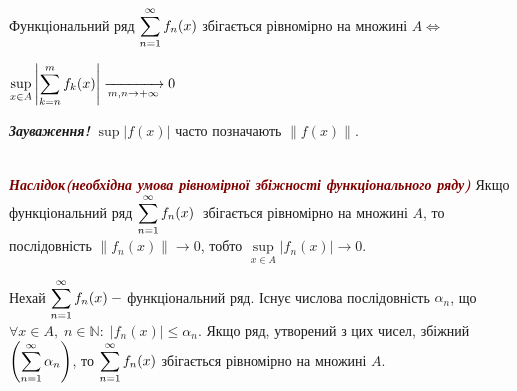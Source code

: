\begin{theorem} 
Функціональний ряд $\displaystyle\sum\limits_{n=1}^\infty f_n(x)$ збігається рівномірно на множині $A\iff$

\centerline{$\underset{x \in A}{\sup} \left|  \displaystyle\sum\limits_{k=n}^m f_k(x)\right| \xrightarrow[m, n \to +\infty]{} 0$}
\end{theorem} 

 \textcolor{NavyBlue}{\textbf{\textit{Зауваження!}}} ${\sup}\left|f(x)\right|$ часто позначають $\|f(x)\|$.
 
$\hspace{20cm}$
\textcolor{Maroon}{\textbf{\textit{{Наслідок(необхідна умова рівномірної збіжності функціонального ряду)}}}}
Якщо функціональний ряд $\displaystyle\sum\limits_{n=1}^\infty f_n(x) \: $ збігається рівномірно на множині $A$, то послідовність $\|f_n(x)\| \rightarrow 0$, тобто $\underset{x \in A}{\sup} \left|f_n(x)\right| \rightarrow 0$.

\begin{theorem} 
Нехай $\displaystyle\sum\limits_{n=1}^\infty f_n(x) \: -$ функціональний ряд. Існує числова послідовність $\alpha_n$, що $\forall x \in A, \; n \in \mathbb{N}: \; |f_n(x)| \leqslant  \alpha_n$. Якщо ряд, утворений з цих чисел, збіжний $\left(\displaystyle\sum\limits_{n=1}^\infty \alpha_n \right)$, то 
 $\displaystyle\sum\limits_{n=1}^\infty f_n(x)$  збігається рівномірно на множині $A$.
 \end{theorem} 

